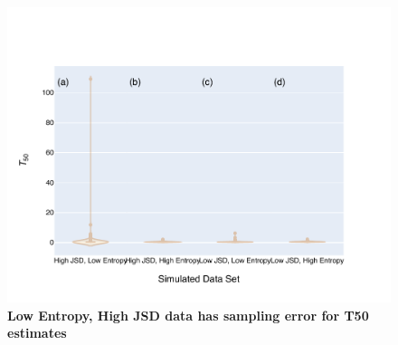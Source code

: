 \begin{figure}[!ht]
\centering
\includegraphics[width=\textwidth]{figures/plots/synthetic/T50/300bp.pdf}
\caption{\textbf{Low Entropy, High JSD data has sampling error for T50 estimates}}
\label{fig:t50_long}
\end{figure}